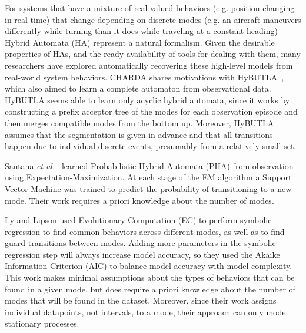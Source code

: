 \documentclass[a4paper]{article}
\begin{document}
For systems that have a mixture of real valued behaviors (e.g. position changing in real time) that change depending on discrete modes (e.g. an aircraft maneuvers differently while turning than it does while traveling at a constant heading) Hybrid Automata (HA) represent a natural formalism. 
Given the desirable properties of HAs, and the ready availability of tools for dealing with them, many researchers have explored automatically recovering these high-level models from real-world system behaviors.
CHARDA shares motivations with HyBUTLA~\cite{niggemann2012learning}, which also aimed to learn a complete automaton from observational data.
HyBUTLA seems able to learn only acyclic hybrid automata, since it works by constructing a prefix acceptor tree of the modes for each observation episode and then merges compatible modes from the bottom up.
Moreover, HyBUTLA assumes that the segmentation is given in advance and that all transitions happen due to individual discrete events, presumably from a relatively small set.


Santana \textit{et al.}~\cite{hybridmodels2015santana} learned Probabilistic Hybrid Automata (PHA) from observation using Expectation-Maximization.  At each stage of the EM algorithm a Support Vector Machine was trained to predict the probability of transitioning to a new mode. Their work requires a priori knowledge about the number of modes.


Ly and Lipson used Evolutionary Computation (EC) to perform symbolic regression \cite{Learning Symbolic Representations of Hybrid Dynamical Systems} to find common behaviors across different modes, as well as to find guard transitions between modes.  Adding more parameters in the symbolic regression step will always increase model accuracy, so they used the Akaike Information Criterion (AIC) to balance model accuracy with model complexity.  This work makes minimal assumptions about the types of behaviors that can be found in a given mode, but does require a priori knowledge about the number of modes that will be found in the dataset. Moreover, since their work assigns individual datapoints, not intervals, to a mode, their approach can only model stationary processes.
\end{document}
